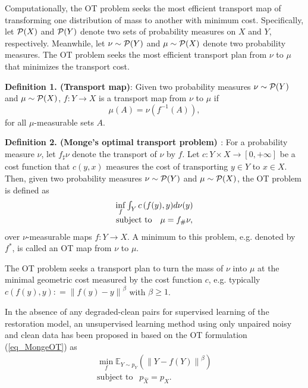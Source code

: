 \documentclass[10pt,journal,compsoc]{IEEEtran}
\begin{document}
Computationally, the OT problem seeks the most efficient transport map of transforming one distribution of mass to another with minimum cost.
Specifically, let ${\cal P}(X)$ and ${\cal P}(Y)$ denote two sets of probability measures on $X$ and $Y$, respectively. 
Meanwhile, let $\nu  \sim {\cal P}(Y)$ and $\mu \sim {\cal P}(X)$ denote two probability measures.
The OT problem seeks the most efficient transport plan from $\nu $ to $\mu$ that minimizes the transport cost.

\textbf{Definition 1. (Transport map)}: 
Given two probability measures $\nu \sim {\cal P}(Y)$ 
and $\mu  \sim {\cal P}(X)$,
$f:Y \to X$ is a transport map from $\nu$ to $\mu$ if
\begin{equation}
\mu (A) = \nu ({f^{ - 1}}(A)) \nonumber,
\end{equation}
for all $\mu$-measurable sets $A$.

\textbf{Definition 2. (Monge’s optimal transport problem) \cite{monge1781memoire}}: 
For a probability measure $\nu$, let ${f_{\sharp}} \nu$ denote the transport of $\nu$ by $f$.
Let $c:Y \times X \to [0, + \infty ]$ be a cost function that $c(y,x)$ measures the cost of transporting $y \in Y$ to $x \in X$. Then, given two probability measures $\nu \sim {\cal P}(Y)$ and $\mu \sim {\cal P}(X)$, the OT problem is defined as%
\begin{equation}
\begin{array}{c}
\mathop {\inf }\limits_f \int_Y {c\left( {f(y),y} \right)} d\nu (y)\\
{\rm{subject \ to\ }}~~\mu  = {f_\# }\nu ,
\end{array}
\label{eq_MongeOT}
\end{equation}
over $\nu$-measurable maps $f:Y \to X$.
A minimum to this problem, e.g. denoted by ${f^*}$, 
is called an OT map from $\nu$ to $\mu$.

The OT problem seeks a transport plan to turn the mass of 
$\nu $ into $\mu $ at the minimal geometric cost measured 
by the cost function $c$, e.g. typically 
$c\left( {f(y),y}\right): = {\left\|{f(y)-y} \right\|^\beta}$ with $\beta\ge 1$.

In the absence of any degraded-clean pairs for supervised 
learning of the restoration model, an unsupervised learning
method using only unpaired noisy and clean data has been 
proposed in \cite{wang2022optimal} based on the OT 
formulation (\ref{eq_MongeOT}) as
\begin{equation}
\begin{gathered}
  \mathop {\min }\limits_f {\mathbb{E}_{Y \sim {p_Y}}}\left(\left\|Y-f(Y)\right\|^\beta\right) \\
  {\text{subject \ to \ }}~~{p_{\hat X}} = {p_X}.
\end{gathered}
\label{eq_ot}
\end{equation}
\end{document}
